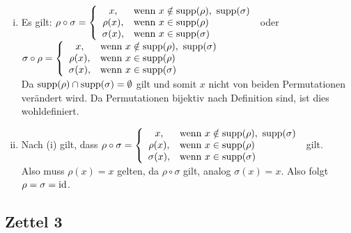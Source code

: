 \\
\begin{enumerate}[(i)]
	\item Es gilt: $\rho\circ\sigma=\left\{\begin{array}{cl} x, & \text{wenn } x\notin \operatorname{supp}(\rho),~\operatorname{supp}(\sigma)\\ \rho(x), & \text{wenn } x\in \operatorname{supp}(\rho)\\ \sigma(x), & \text{wenn } x\in \operatorname{supp}(\sigma) \end{array}\right.$
	oder 
	$\sigma\circ\rho=\left\{\begin{array}{cl} x, & \text{wenn } x\notin \operatorname{supp}(\rho),~\operatorname{supp}(\sigma)\\ \rho(x), & \text{wenn } x\in \operatorname{supp}(\rho)\\ \sigma(x), & \text{wenn } x\in \operatorname{supp}(\sigma) \end{array}\right.$\\
	
	Da $\operatorname{supp}(\rho)\cap \operatorname{supp}(\sigma)=\emptyset$ gilt und somit $x$ nicht von beiden Permutationen verändert wird. Da Permutationen bijektiv nach Definition sind, ist dies wohldefiniert.
	\item Nach (i) gilt, dass $\rho\circ\sigma=\left\{\begin{array}{cl} x, & \text{wenn } x\notin \operatorname{supp}(\rho),~\operatorname{supp}(\sigma)\\ \rho(x), & \text{wenn } x\in \operatorname{supp}(\rho)\\ \sigma(x), & \text{wenn } x\in \operatorname{supp}(\sigma) \end{array}\right.$ gilt.\\
	
	Also muss $\rho(x)=x$ gelten, da $\rho\circ\sigma$ gilt, analog $\sigma(x)=x$. Also folgt $\rho=\sigma=\operatorname{id}$.
\end{enumerate}

\subsection{Zettel 3}
\label{sub:zettel_3alg}




\cleardoubleoddemptypage
{}
\setcounter{page}{1}




\printindex
\listoffigures
